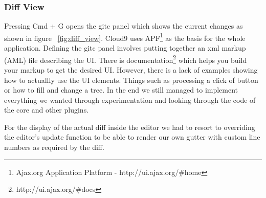 \subsubsection{Diff View}

Pressing Cmd + G opens the gitc panel which shows the current changes as shown in figure ~\ref{fig:diff_view}.
Cloud9 uses APF\footnote{Ajax.org Application Platform - http://ui.ajax.org/#home} as the basis for the whole application.
Defining the gitc panel involves putting together an xml markup (AML) file describing the UI.
There is documentation\footnote{http://ui.ajax.org/#docs} which helps you build your markup to get the desired UI.
However, there is a lack of examples showing how to actuallly use the UI elements. Things such as processing a click of button
or how to fill and change a tree.
In the end we still managed to implement everything we wanted through experimentation and looking through the code of the core
and other plugins.

For the display of the actual diff inside the editor we had to resort to overriding the editor's update function to be able to
render our own gutter with custom line numbers as required by the diff.
